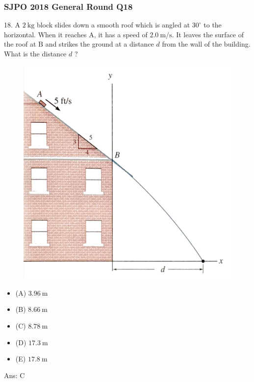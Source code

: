 \documentclass{article}
\begin{document}
\begin{samepage}
\subsubsection{SJPO 2018 General Round Q18}
18. A $2 \mathrm{~kg}$ block slides down a smooth roof which is angled at $30^{\circ}$ to the horizontal. When it reaches $\mathrm{A}$, it has a speed of $2.0 \mathrm{~m} / \mathrm{s}$. It leaves the surface of the roof at $\mathrm{B}$ and strikes the ground at a distance $d$ from the wall of the building. What is the distance $d$ ?
 \begin{figure} 
\includegraphics[width=\linewidth]{images/2018q18.png}
\end{figure}
\begin{itemize}
\item[](A) $3.96 \mathrm{~m}$
\item[](B) $8.66 \mathrm{~m}$
\item[](C) $8.78 \mathrm{~m}$
\item[](D) $17.3 \mathrm{~m}$
\item[](E) $17.8 \mathrm{~m}$
\end{itemize}
Ans: \ifpaper C \fi \\[10pt]
\end{samepage}
\end{document}
